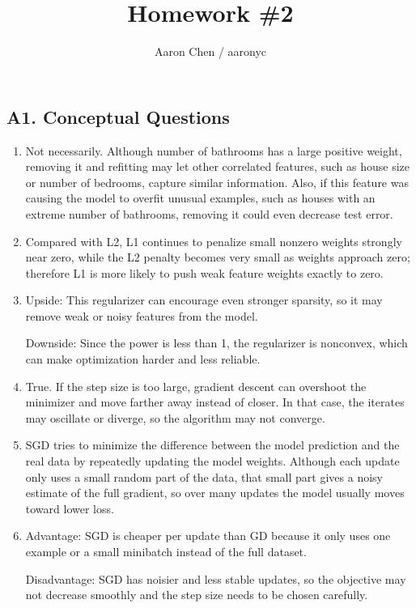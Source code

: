\documentclass[fleqn]{article}
\begin{document}
\title{Homework \#2}
\author{Aaron Chen / aaronyc}
\date{}
\maketitle


\subsection*{A1. Conceptual Questions}

\begin{enumerate}[label=(\alph*)]
\item
Not necessarily. Although number of bathrooms has a large positive weight, removing it and refitting may let other correlated features, such as house size or number of bedrooms, capture similar information. Also, if this feature was causing the model to overfit unusual examples, such as houses with an extreme number of bathrooms, removing it could even decrease test error.

\item
Compared with L2, L1 continues to penalize small nonzero weights strongly near zero, while the L2 penalty becomes very small as weights approach zero; therefore L1 is more likely to push weak feature weights exactly to zero.

\item
Upside: This regularizer can encourage even stronger sparsity, so it may remove weak or noisy features from the model.

Downside: Since the power is less than 1, the regularizer is nonconvex, which can make optimization harder and less reliable.

\item
True. If the step size is too large, gradient descent can overshoot the minimizer and move farther away instead of closer. In that case, the iterates may oscillate or diverge, so the algorithm may not converge.

\item
SGD tries to minimize the difference between the model prediction and the real data by repeatedly updating the model weights. Although each update only uses a small random part of the data, that small part gives a noisy estimate of the full gradient, so over many updates the model usually moves toward lower loss.

\item
Advantage: SGD is cheaper per update than GD because it only uses one example or a small minibatch instead of the full dataset.

Disadvantage: SGD has noisier and less stable updates, so the objective may not decrease smoothly and the step size needs to be chosen carefully.
\end{enumerate}
\end{document}

